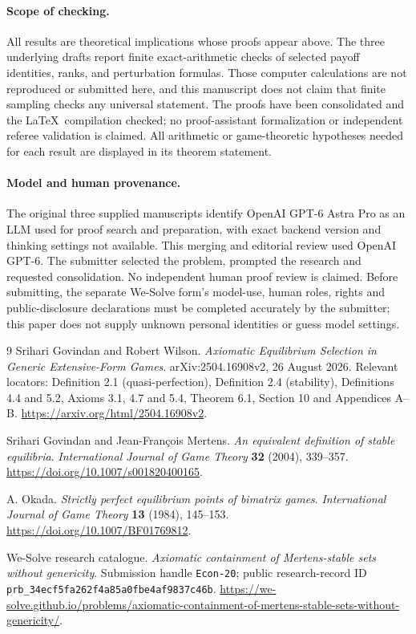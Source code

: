 \documentclass[11pt]{article}
\theoremstyle{definition}
\theoremstyle{remark}
\begin{document}
\paragraph{Scope of checking.}
All results are theoretical implications whose proofs appear above.
The three underlying drafts report finite exact-arithmetic checks of
selected payoff identities, ranks, and perturbation formulas. Those
computer calculations are not reproduced or submitted here, and this
manuscript does not claim that finite sampling checks any universal
statement. The proofs have been consolidated and the \LaTeX\ compilation
checked; no proof-assistant formalization or independent referee
validation is claimed. All arithmetic or game-theoretic hypotheses
needed for each result are displayed in its theorem statement.

\paragraph{Model and human provenance.}
The original three supplied manuscripts identify OpenAI GPT-6 Astra Pro
as an LLM used for proof search and preparation, with exact backend
version and thinking settings not available. This merging and editorial
review used OpenAI GPT-6. The submitter selected the problem, prompted
the research and requested consolidation. No independent human proof
review is claimed. Before submitting, the separate We-Solve form's
model-use, human roles, rights and public-disclosure declarations must
be completed accurately by the submitter; this paper does not supply
unknown personal identities or guess model settings.

\begin{thebibliography}{9}
Srihari Govindan and Robert Wilson.
\emph{Axiomatic Equilibrium Selection in Generic Extensive-Form Games}.
arXiv:2504.16908v2, 26 August 2026.
Relevant locators: Definition 2.1 (quasi-perfection), Definition 2.4
(stability), Definitions 4.4 and 5.2, Axioms 3.1, 4.7 and 5.4,
Theorem 6.1, Section 10 and Appendices A--B.
\url{https://arxiv.org/html/2504.16908v2}.

Srihari Govindan and Jean-Fran\c{c}ois Mertens.
\emph{An equivalent definition of stable equilibria}.
\emph{International Journal of Game Theory} \textbf{32} (2004), 339--357.
\url{https://doi.org/10.1007/s001820400165}.

A. Okada.
\emph{Strictly perfect equilibrium points of bimatrix games}.
\emph{International Journal of Game Theory} \textbf{13} (1984), 145--153.
\url{https://doi.org/10.1007/BF01769812}.

We-Solve research catalogue.
\emph{Axiomatic containment of Mertens-stable sets without genericity}.
Submission handle \texttt{Econ-20}; public research-record ID
\texttt{prb\_34ecf5fa262f4a85a0fbe4af9837c46b}.
\url{https://we-solve.github.io/problems/axiomatic-containment-of-mertens-stable-sets-without-genericity/}.
\end{thebibliography}
\end{document}
